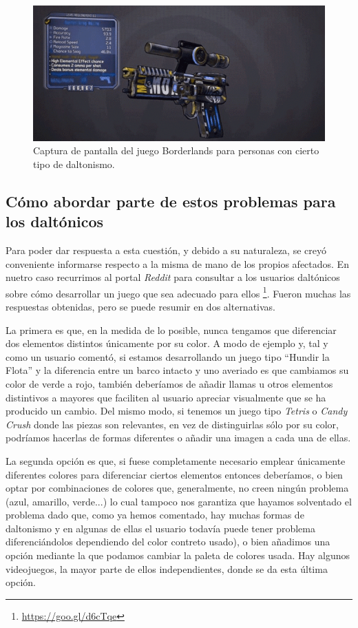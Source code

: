 \begin{figure}[H]
		\includegraphics[width=\textwidth,height=\textheight,keepaspectratio]{./img/borderlandscolorblind.png}
	\caption{Captura de pantalla del juego Borderlands para personas con cierto tipo de daltonismo.}
	\label{fig:borderlandscolorblind}
\end{figure}

\subsection{Cómo abordar parte de estos problemas para los daltónicos}
\label{sec:daltonicossolventar}

Para poder dar respuesta a esta cuestión, y debido a su naturaleza, se creyó conveniente informarse respecto a la misma de mano de los propios afectados. En nuetro caso recurrimos al portal \textit{Reddit} para consultar a los usuarios daltónicos sobre cómo desarrollar un juego que sea adecuado para ellos \footnote{\url{https://goo.gl/d6cTqe}}. Fueron muchas las respuestas obtenidas, pero se puede resumir en dos alternativas.

La primera es que, en la medida de lo posible, nunca tengamos que diferenciar dos elementos distintos únicamente por su color. A modo de ejemplo y, tal y como un usuario comentó, si estamos desarrollando un juego tipo ``Hundir la Flota'' y la diferencia entre un barco intacto y uno averiado es que cambiamos su color de verde a rojo, también deberíamos de añadir llamas u otros elementos distintivos a mayores que faciliten al usuario apreciar visualmente que se ha producido un cambio. Del mismo modo, si tenemos un juego tipo \textit{Tetris} o \textit{Candy Crush} donde las piezas son relevantes, en vez de distinguirlas sólo por su color, podríamos hacerlas de formas diferentes o añadir una imagen a cada una de ellas.

La segunda opción es que, si fuese completamente necesario emplear únicamente diferentes colores para diferenciar ciertos elementos entonces deberíamos, o bien optar por combinaciones de colores que, generalmente, no creen ningún problema (azul, amarillo, verde...) lo cual tampoco nos garantiza que hayamos solventado el problema dado que, como ya hemos comentado, hay muchas formas de daltonismo y en algunas de ellas el usuario todavía puede tener problema diferenciándolos dependiendo del color contreto usado), o bien añadimos una opción mediante la que podamos cambiar la paleta de colores usada. Hay algunos videojuegos, la mayor parte de ellos independientes, donde se da esta última opción. 